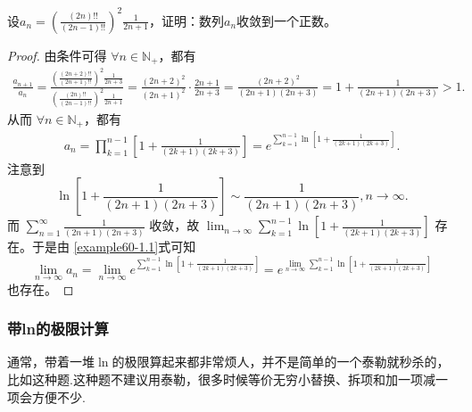 \documentclass[../../main.tex]{subfiles}
\begin{document}
\begin{example}
设\(a_n=\left(\frac{(2n)!!}{(2n - 1)!!}\right)^2\frac{1}{2n + 1}\)，证明：数列\(a_n\)收敛到一个正数。
\end{example}
\begin{proof}
由条件可得 \(\forall n\in \mathbb{N}_+\)，都有
\begin{align*}
\frac{a_{n+1}}{a_n}=\frac{\left( \frac{(2n+2)!!}{(2n+1)!!} \right) ^2\frac{1}{2n+3}}{\left( \frac{(2n)!!}{(2n-1)!!} \right) ^2\frac{1}{2n+1}}=\frac{\left( 2n+2 \right) ^2}{\left( 2n+1 \right) ^2}\cdot \frac{2n+1}{2n+3}=\frac{\left( 2n+2 \right) ^2}{\left( 2n+1 \right) \left( 2n+3 \right)}=1+\frac{1}{\left( 2n+1 \right) \left( 2n+3 \right)}>1.
\end{align*}
从而 \(\forall n\in \mathbb{N}_+\)，都有
\begin{align}
a_n=\prod_{k = 1}^{n - 1}\left[1+\frac{1}{(2k + 1)(2k + 3)}\right]=e^{\sum\limits_{k = 1}^{n - 1}\ln\left[1+\frac{1}{(2k + 1)(2k + 3)}\right]}. \label{example60-1.1}
\end{align}
注意到
\[
\ln\left[1+\frac{1}{(2n + 1)(2n + 3)}\right]\sim\frac{1}{(2n + 1)(2n + 3)},n\rightarrow\infty.
\]
而 \(\sum_{n = 1}^{\infty}\frac{1}{(2n + 1)(2n + 3)}\) 收敛，故 \(\lim_{n\rightarrow\infty}\sum_{k = 1}^{n - 1}\ln\left[1+\frac{1}{(2k + 1)(2k + 3)}\right]\) 存在。于是由 \eqref{example60-1.1}式可知
\[
\lim_{n\rightarrow\infty}a_n=\lim_{n\rightarrow\infty}e^{\sum\limits_{k = 1}^{n - 1}\ln\left[1+\frac{1}{(2k + 1)(2k + 3)}\right]}=e^{\lim\limits_{n\rightarrow\infty}\sum\limits_{k = 1}^{n - 1}\ln\left[1+\frac{1}{(2k + 1)(2k + 3)}\right]}
\]
也存在。
\end{proof}


\subsubsection{带ln的极限计算}
通常，带着一堆\(\ln\)的极限算起来都非常烦人，并不是简单的一个泰勒就秒杀的，比如这种题.这种题不建议用泰勒，很多时候等价无穷小替换、拆项和加一项减一项会方便不少.
\end{document}
